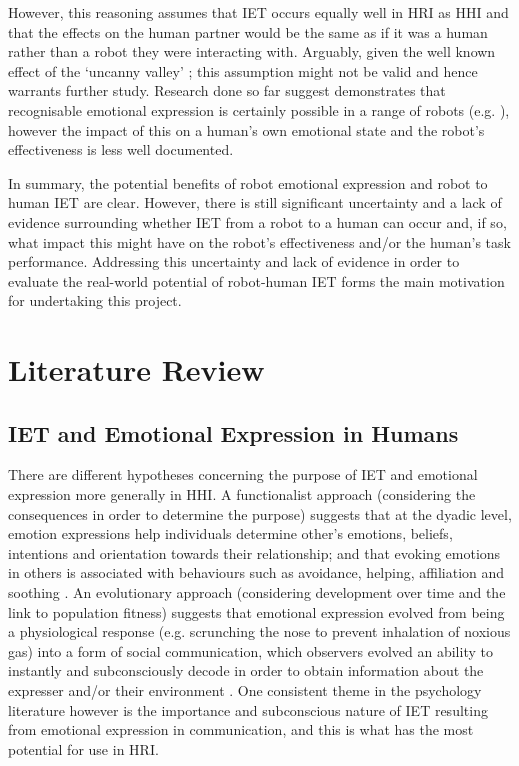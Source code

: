 \documentclass[11pt]{article}
\begin{document}
However, this reasoning assumes that IET occurs equally well in HRI as HHI and that the effects on the human partner would be the same as if it was a human rather than a robot they were interacting with. Arguably, given the well known effect of the `uncanny valley' \cite{mori2012uncanny}; this assumption might not be valid and hence warrants further study. Research done so far suggest demonstrates that recognisable emotional expression is certainly possible in a range of robots (e.g. \cite{masuda2009emotion} \cite{tielman2014adaptive} \cite{lim2011converting}), however the impact of this on a human's own emotional state and the robot's effectiveness is less well documented. 

In summary, the potential benefits of robot emotional expression and robot to human IET are clear. However, there is still significant uncertainty and a lack of evidence surrounding whether IET from a robot to a human can occur  and, if so, what impact this might have on the robot's effectiveness and/or the human's task performance. Addressing this uncertainty and lack of evidence in order to evaluate the real-world potential of robot-human IET forms the main motivation for undertaking this project. 

\section{Literature Review}
\subsection{IET and Emotional Expression in Humans}
There are different hypotheses concerning the purpose of IET and emotional expression more generally in HHI. A functionalist approach (considering the consequences in order to determine the purpose) suggests that at the dyadic level, emotion expressions help individuals determine other's emotions, beliefs, intentions and orientation towards their relationship; and that evoking emotions in others is associated with behaviours such as avoidance, helping, affiliation and soothing \cite{keltner1999social}. An evolutionary approach (considering development over time and the link to population fitness) suggests that emotional expression evolved from being a physiological response (e.g. scrunching the nose to prevent inhalation of noxious gas) into a form of social communication, which observers evolved an ability to instantly and subconsciously decode in order to obtain information about the expresser and/or their environment \cite{shariff2011emotion}. One consistent theme in the psychology literature however is the importance and subconscious nature of IET resulting from emotional expression in communication, and this is what has the most potential for use in HRI. 
\end{document}
